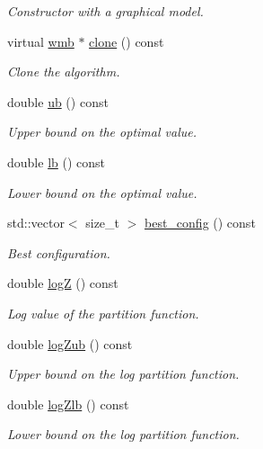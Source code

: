\begin{DoxyCompactItemize}
\begin{DoxyCompactList}\small\item\em Constructor with a graphical model. \end{DoxyCompactList}\item 
virtual \hyperlink{classmerlin_1_1wmb}{wmb} $\ast$ \hyperlink{classmerlin_1_1wmb_a9a9120ce51df90d8c6fc60c01f308dd4}{clone} () const 
\begin{DoxyCompactList}\small\item\em Clone the algorithm. \end{DoxyCompactList}\item 
double \hyperlink{classmerlin_1_1wmb_a78d08bbf18835324d79a4f73eebeecc7}{ub} () const 
\begin{DoxyCompactList}\small\item\em Upper bound on the optimal value. \end{DoxyCompactList}\item 
double \hyperlink{classmerlin_1_1wmb_a88a812b53de1bde731d7d21305be6041}{lb} () const 
\begin{DoxyCompactList}\small\item\em Lower bound on the optimal value. \end{DoxyCompactList}\item 
std\+::vector$<$ size\+\_\+t $>$ \hyperlink{classmerlin_1_1wmb_ae2de6f3bc30e524b6e9190d02631af4f}{best\+\_\+config} () const 
\begin{DoxyCompactList}\small\item\em Best configuration. \end{DoxyCompactList}\item 
double \hyperlink{classmerlin_1_1wmb_aa2af3a4102ee07f954d24c44066f6a08}{log\+Z} () const 
\begin{DoxyCompactList}\small\item\em Log value of the partition function. \end{DoxyCompactList}\item 
double \hyperlink{classmerlin_1_1wmb_a91015e29caed663c30bb37cbd0609e24}{log\+Zub} () const 
\begin{DoxyCompactList}\small\item\em Upper bound on the log partition function. \end{DoxyCompactList}\item 
double \hyperlink{classmerlin_1_1wmb_affa03e963d632f43e2c5967cd3f7bff4}{log\+Zlb} () const 
\begin{DoxyCompactList}\small\item\em Lower bound on the log partition function. \end{DoxyCompactList}\item 

\end{DoxyCompactItemize}
